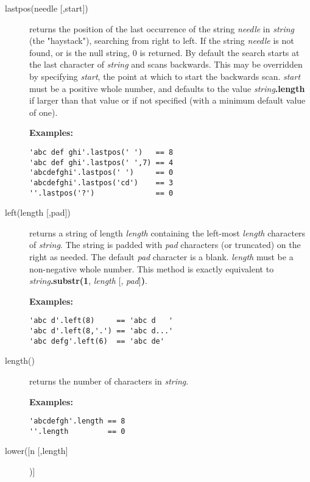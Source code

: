 \begin{description}
\item[lastpos(needle [,start{]})]\label{reflastpos}
returns the position of the last occurrence of the string
\emph{needle} in \emph{string} (the "haystack"), searching
from right to left.
If the string \emph{needle} is not found, or is the null string,
0 is returned.
By default the search starts at the last character of
\emph{string} and scans backwards.
This may be overridden by specifying \emph{start}, the point at
which to start the backwards scan.
\emph{start} must be a positive whole number, and defaults to the
value \emph{string}\textbf{.length} if larger than that
value or if not specified (with a minimum default value of one).
 
\textbf{Examples:}
\begin{lstlisting}
'abc def ghi'.lastpos(' ')   == 8
'abc def ghi'.lastpos(' ',7) == 4
'abcdefghi'.lastpos(' ')     == 0
'abcdefghi'.lastpos('cd')    == 3
''.lastpos('?')              == 0
\end{lstlisting}

\item[left(length [,pad{]})]\label{refleft}
returns a string of length \emph{length} containing the
left-most \emph{length} characters of \emph{string}.
The string is padded with \emph{pad} characters (or truncated) on
the right as needed.
The default \emph{pad} character is a blank.
\emph{length} must be a non-negative whole number.
This method is exactly equivalent to
\emph{string}\textbf{.substr(1}, \emph{length}
[, \emph{pad}]\textbf{)}.
 
\textbf{Examples:}
\begin{lstlisting}
'abc d'.left(8)     == 'abc d   '
'abc d'.left(8,'.') == 'abc d...'
'abc defg'.left(6)  == 'abc de'
\end{lstlisting}

\item[length()]\label{reflength}
returns the number of characters in \emph{string}.
 
\textbf{Examples:}
\begin{lstlisting}
'abcdefgh'.length == 8
''.length         == 0
\end{lstlisting}
\item[lower([n [,length{]}])]\label{reflower}


\end{description}
